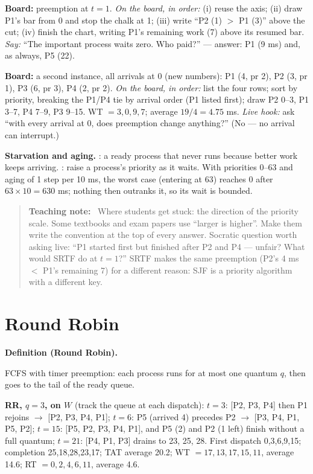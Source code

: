 \documentclass[11pt]{article}
\newenvironment{definitionbox}[1]{%
  \par\noindent\textbf{Definition (#1).}\ \itshape
}{\par\vspace{0.3em}}
\newenvironment{teachingaside}{\begin{quote}\small\color{primary-gold}\textbf{Teaching note:}\ }{\end{quote}}
\begin{document}
\textbf{Board:} preemption at $t=1$. \emph{On the board, in order:} (i) reuse the axis; (ii) draw P1's bar from 0 and stop the chalk at 1; (iii) write ``P2 (1) $>$ P1 (3)'' above the cut; (iv) finish the chart, writing P1's remaining work (7) above its resumed bar. \emph{Say:} ``The important process waits zero. Who paid?'' --- answer: P1 (9 ms) and, as always, P5 (22).

\textbf{Board:} a second instance, all arrivals at 0 (new numbers): P1 (4, pr 2), P2 (3, pr 1), P3 (6, pr 3), P4 (2, pr 2). \emph{On the board, in order:} list the four rows; sort by priority, breaking the P1/P4 tie by arrival order (P1 listed first); draw P2 0--3, P1 3--7, P4 7--9, P3 9--15. WT $= 3,0,9,7$; average $19/4 = 4.75$ ms. \emph{Live hook:} ask ``with every arrival at 0, does preemption change anything?'' (No --- no arrival can interrupt.)

\textbf{Starvation and aging.} : a ready process that never runs because better work keeps arriving. : raise a process's priority as it waits. With priorities 0--63 and aging of 1 step per 10 ms, the worst case (entering at 63) reaches 0 after $63\times10 = 630$ ms; nothing then outranks it, so its wait is bounded.

\begin{teachingaside}
Where students get stuck: the direction of the priority scale. Some textbooks and exam papers use ``larger is higher''. Make them write the convention at the top of every answer. Socratic question worth asking live: ``P1 started first but finished after P2 and P4 --- unfair? What would SRTF do at $t=1$?'' SRTF makes the same preemption (P2's 4 ms $<$ P1's remaining 7) for a different reason: SJF is a priority algorithm with a different key.
\end{teachingaside}

\section{Round Robin}

\begin{definitionbox}{Round Robin}
FCFS with timer preemption: each process runs for at most one quantum $q$, then goes to the tail of the ready queue.
\end{definitionbox}

\textbf{RR, $q=3$, on $W$} (track the queue at each dispatch): $t=3$: [P2, P3, P4] then P1 rejoins $\to$ [P2, P3, P4, P1]; $t=6$: P5 (arrived 4) precedes P2 $\to$ [P3, P4, P1, P5, P2]; $t=15$: [P5, P2, P3, P4, P1], and P5 (2) and P2 (1 left) finish without a full quantum; $t=21$: [P4, P1, P3] drains to 23, 25, 28. First dispatch 0,3,6,9,15; completion 25,18,28,23,17; TAT average 20.2; WT $= 17,13,17,15,11$, average 14.6; RT $= 0,2,4,6,11$, average 4.6.
\end{document}
